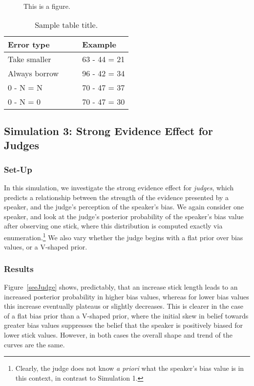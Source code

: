 \documentclass[10pt,letterpaper]{article}
\begin{document}
\begin{figure}[H]
\begin{center}
\end{center}
\caption{This is a figure.} 
\label{seeSpeaker}
\end{figure}

\begin{table}[H]
\begin{center} 
\caption{Sample table title.} 
\label{seeSpeakerTable} 
\vskip 0.12in
\begin{tabular}{ll} 
\hline
Error type    &  Example \\
\hline
Take smaller        &   63 - 44 = 21 \\
Always borrow~~~~   &   96 - 42 = 34 \\
0 - N = N           &   70 - 47 = 37 \\
0 - N = 0           &   70 - 47 = 30 \\
\hline
\end{tabular} 
\end{center} 
\end{table}

\subsection{Simulation 3: Strong Evidence Effect for Judges}
\subsubsection{Set-Up}
In this simulation, we investigate the strong evidence effect for \textit{judges}, which predicts a relationship between 
the strength of the evidence presented by a speaker, and the judge's perception of the speaker's bias.
We again consider one speaker, and look at the judge's posterior probability of the speaker's bias value after 
observing one stick, where this distribution is computed exactly via enumeration.\footnote{Clearly, the judge does 
not know \textit{a priori} what the speaker's bias value is in this context, in contrast to Simulation 1.} We also vary 
whether the judge begins with a flat prior over bias values, or a V-shaped prior.

\subsubsection{Results}
Figure~\ref{seeJudge} shows, predictably, that an increase stick length leads to an increased posterior probability in
higher bias values, whereas for lower bias values this increase eventually plateaus or slightly decreases. This is clearer 
in the case of a flat bias prior than a V-shaped prior, where the initial skew in belief towards greater bias values suppresses
the belief that the speaker is positively biased for lower stick values. However, in both cases the overall shape and trend 
of the curves are the same.
\end{document}
